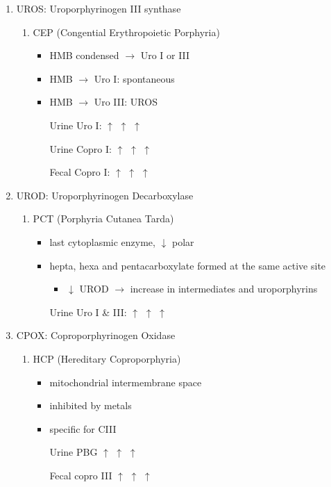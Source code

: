 \documentclass{scrartcl}
\begin{document}
\begin{enumerate}
\item UROS: Uroporphyrinogen III synthase
\label{sec:org444c2db}
\begin{enumerate}
\item CEP (Congential Erythropoietic Porphyria)
\label{sec:orgb191bd9}
\begin{itemize}
\item HMB condensed \(\to\) Uro I or III
\item HMB \(\rightarrow\) Uro I: spontaneous
\item HMB \(\rightarrow\) Uro III: UROS
\item[{Urine Uro I:}] \(\uparrow\) \(\uparrow\) \(\uparrow\)
\item[{Urine Copro I:}] \(\uparrow\) \(\uparrow\) \(\uparrow\)
\item[{Fecal Copro I:}] \(\uparrow\) \(\uparrow\) \(\uparrow\)
\end{itemize}
\end{enumerate}

\item UROD: Uroporphyrinogen Decarboxylase
\label{sec:org75f61b4}
\begin{enumerate}
\item PCT (Porphyria Cutanea Tarda)
\label{sec:orga0cc180}
\begin{itemize}
\item last cytoplasmic enzyme, \(\downarrow\) polar
\item hepta, hexa and pentacarboxylate formed at the same active site
\begin{itemize}
\item \(\downarrow\) UROD \(\to\) increase in intermediates and uroporphyrins
\end{itemize}
\item[{Urine Uro I \& III:}] \(\uparrow\) \(\uparrow\) \(\uparrow\)
\end{itemize}
\end{enumerate}
\item CPOX: Coproporphyrinogen Oxidase
\label{sec:org9e7c994}
\begin{enumerate}
\item HCP (Hereditary Coproporphyria)
\label{sec:org7d9fa09}
\begin{itemize}
\item mitochondrial intermembrane space
\item inhibited by metals
\item specific for CIII
\item[{Urine PBG}] \(\uparrow\) \(\uparrow\) \(\uparrow\)
\item[{Fecal copro III}] \(\uparrow\) \(\uparrow\) \(\uparrow\)
\end{itemize}
\end{enumerate}


\end{enumerate}
\end{document}
